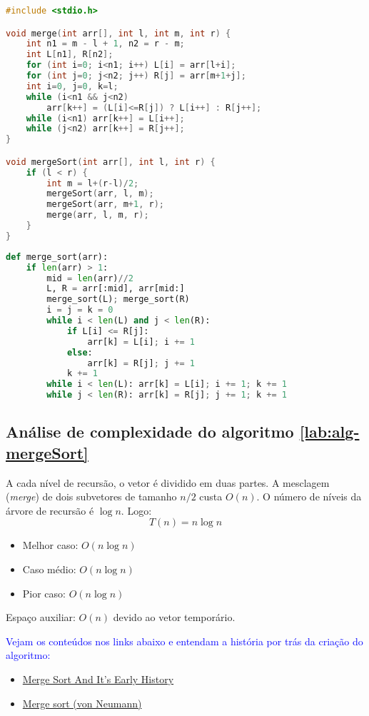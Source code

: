 \begin{lstlisting}[language=C, caption={Implementação do Merge Sort em C}, label=code:mergeSort]
#include <stdio.h>

void merge(int arr[], int l, int m, int r) {
    int n1 = m - l + 1, n2 = r - m;
    int L[n1], R[n2];
    for (int i=0; i<n1; i++) L[i] = arr[l+i];
    for (int j=0; j<n2; j++) R[j] = arr[m+1+j];
    int i=0, j=0, k=l;
    while (i<n1 && j<n2)
        arr[k++] = (L[i]<=R[j]) ? L[i++] : R[j++];
    while (i<n1) arr[k++] = L[i++];
    while (j<n2) arr[k++] = R[j++];
}

void mergeSort(int arr[], int l, int r) {
    if (l < r) {
        int m = l+(r-l)/2;
        mergeSort(arr, l, m);
        mergeSort(arr, m+1, r);
        merge(arr, l, m, r);
    }
}
\end{lstlisting}

\begin{lstlisting}[language=Python, caption={Merge Sort em Python}, label=code:mergeSortPy]
def merge_sort(arr):
    if len(arr) > 1:
        mid = len(arr)//2
        L, R = arr[:mid], arr[mid:]
        merge_sort(L); merge_sort(R)
        i = j = k = 0
        while i < len(L) and j < len(R):
            if L[i] <= R[j]:
                arr[k] = L[i]; i += 1
            else:
                arr[k] = R[j]; j += 1
            k += 1
        while i < len(L): arr[k] = L[i]; i += 1; k += 1
        while j < len(R): arr[k] = R[j]; j += 1; k += 1
\end{lstlisting}

\subsection{Análise de complexidade do algoritmo \ref{lab:alg-mergeSort}}
A cada nível de recursão, o vetor é dividido em duas partes. A mesclagem (\textit{merge}) de dois subvetores de tamanho $n/2$ custa $O(n)$. O número de níveis da árvore de recursão é $\log n$. Logo:
\[
T(n) = n \log n
\]
\begin{itemize}
    \item Melhor caso: $O(n \log n)$
    \item Caso médio: $O(n \log n)$
    \item Pior caso: $O(n \log n)$
\end{itemize}
Espaço auxiliar: $O(n)$ devido ao vetor temporário.

\textcolor{blue}{Vejam os conteúdos nos links abaixo e entendam a história por trás da criação do algoritmo:}
\begin{itemize}
    \item 
      \href{https://compileralchemy.substack.com/p/merge-sort-and-its-early-history}{Merge Sort And It's Early History}
    \item 
      \href{https://compileralchemy.substack.com/p/merge-sort-and-its-early-history}{Merge sort (von Neumann)}
\end{itemize}


